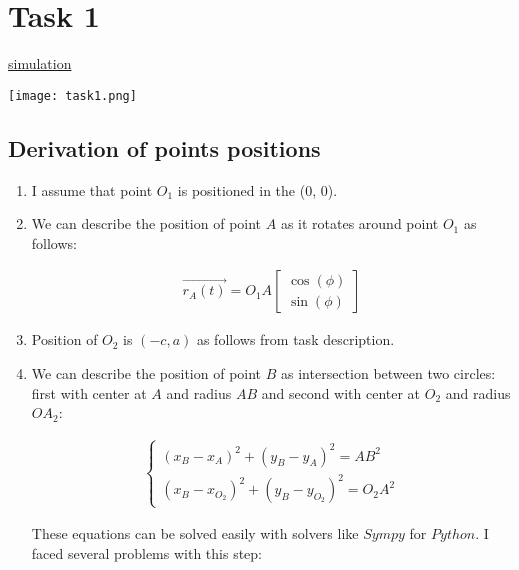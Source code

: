 \section{Task 1}

\href{https://lvjonok.github.io/f22-theoretical-mechanics/homework2/motion_task1.gif}{simulation}

\texttt{[image: task1.png]}

\subsection{Derivation of points positions}

\begin{enumerate}
    \item I assume that point $O_1$ is positioned in the (0, 0).
    \item We can describe the position of point $A$ as it rotates around point $O_1$ as follows:
          \begin{answer}
              \begin{align}
                  \vec{r_A(t)} = O_1A \begin{bmatrix}
                      \cos(\phi) \\
                      \sin(\phi)
                  \end{bmatrix}
              \end{align}
          \end{answer}
    \item Position of $O_2$ is $(-c, a)$ as follows from task description.
    \item We can describe the position of point $B$ as intersection between two circles: first with center at $A$ and radius $AB$ and second with center at $O_2$ and radius $OA_2$:
          \begin{answer}
              \begin{align}
                  \begin{cases}
                      (x_B - x_A)^2 + (y_B - y_A)^2 = AB^2 \\
                      (x_B - x_{O_2})^2 + (y_B - y_{O_2})^2 = O_2A^2
                  \end{cases}
              \end{align}
          \end{answer}
          These equations can be solved easily with solvers like $Sympy$ for $Python$.
          I faced several problems with this step:
          \begin{enumerate}

\end{enumerate}
\end{enumerate}
